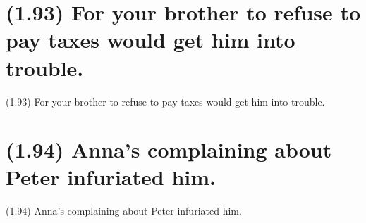 \documentclass{article}
\begin{document}
\clearpage

%
%

\section*{(1.93) For your brother to refuse to pay taxes would get him into trouble.}

\bigbreak
\begin{enumerate*}
\item[(1.93)] For your brother to refuse to pay taxes would get him into trouble.
\end{enumerate*}
\bigbreak

\bigbreak
\begin{minipage}{\textwidth}
\end{minipage}
\bigbreak

\clearpage

%
%

\section*{(1.94) Anna's complaining about Peter infuriated him.}

\bigbreak
\begin{enumerate*}
\item[(1.94)] Anna's complaining about Peter infuriated him.
\end{enumerate*}
\bigbreak
\end{document}
